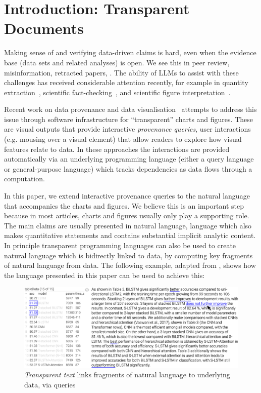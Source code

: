 \section{Introduction: Transparent Documents}

Making sense of and verifying data-driven claims is hard, even when the evidence base (data sets and related
analyses) is open. We see this in peer review, misinformation, retracted papers, . The ability of LLMs to assist with these challenges has received considerable attention recently,
for example in quantity extraction~\citep{bolucu23}, scientific fact-checking~\citep{abu-ahmad25}, and
scientific figure interpretation~\citep{roberts24}.

Recent work on data provenance and data visualisation~\citep{psallidas18smoke,perera22,bond25} attempts to
address this issue through software infrastructure for ``transparent'' charts and figures.  These are visual outputs that provide interactive
\emph{provenance queries}, user interactions (e.g. mousing over a visual element) that allow readers to
explore how visual features relate to data. In these approaches the interactions are provided automatically
via an underlying programming language (either a query language or general-purpose language) which tracks
dependencies as data flows through a computation.

In this paper, we extend interactive provenance queries to the natural language that accompanies the charts
and figures. We believe this is an important step because in most articles, charts and figures usually only
play a supporting role. The main claims are usually presented in natural language, language which also makes
quantitative statements and contains substantial implicit analytic content. In principle transparent
programming languages can also be used to create natural language which is bidirectly linked to data, by
computing key fragments of natural language from data. The following example, adapted from \cite{moosavi21},
shows how the language presented in this paper can be used to achieve this:

\begin{figure}%
    \centering
    \includegraphics[width=\linewidth]{fig/scigen-1805.02474v1-10-with-pointer.png}
    \caption{\emph{Transparent text} links fragments of natural language to underlying data, via queries}\label{fig:scigen-example-website}
\end{figure}

